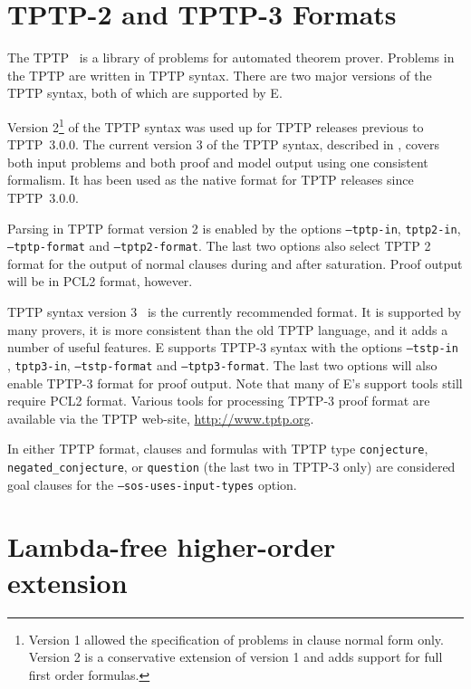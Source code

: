 \documentclass{report}
\begin{document}
\section{TPTP-2 and TPTP-3 Formats}

The TPTP~\cite{Sutcliffe:TPTP-WWW} is a library of
problems for automated theorem prover. Problems in the TPTP are
written in TPTP syntax. There are two major
versions of the TPTP syntax, both of which are supported by E.

Version 2\footnote{Version 1 allowed the specification of problems in
  clause normal form only. Version 2 is a conservative extension of
  version 1 and adds support for full first order formulas.} of the
TPTP syntax was used up for TPTP releases previous to TPTP~3.0.0.  The
current version 3 of the TPTP syntax, described in
\cite{SSCG:IJCAR-2006}, covers both input problems and both proof and
model output using one consistent formalism. It has been used as the
native format for TPTP releases since TPTP~3.0.0.

Parsing in TPTP format version 2 is enabled by the options
\texttt{--tptp-in}, \texttt{tptp2-in}, \texttt{--tptp-format} and
\texttt{--tptp2-format}. The last two options also select TPTP 2
format for the output of normal clauses during and after
saturation. Proof output will be in PCL2 format, however.

TPTP syntax version 3~\cite{SSCG:IJCAR-2006,SSCB:LPAR-2012} is the
currently recommended format. It is supported by many provers, it is
more consistent than the old TPTP language, and it adds a number of
useful features.  E supports TPTP-3 syntax with the options
\texttt{--tstp-in} , \texttt{tptp3-in}, \texttt{--tstp-format} and
\texttt{--tptp3-format}. The last two options will also enable TPTP-3
format for proof output. Note that many of E's support tools still
require PCL2 format. Various tools for processing TPTP-3 proof format
are available via the TPTP web-site, \url{http://www.tptp.org}.

In either TPTP format, clauses and formulas with TPTP type
\texttt{conjecture}, \texttt{negated\_conjecture}, or
\texttt{question} (the last two in TPTP-3 only) are considered goal
clauses for the \texttt{--sos-uses-input-types} option.

\section{Lambda-free higher-order extension}
\end{document}
